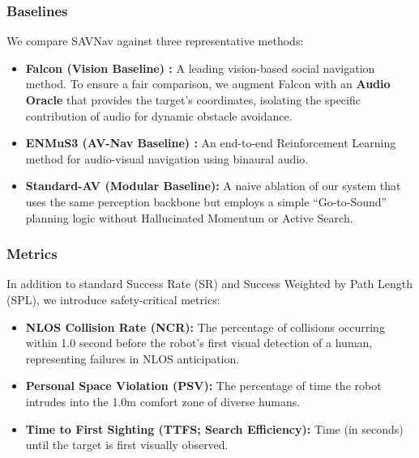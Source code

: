 \subsubsection{Baselines}
We compare SAVNav against three representative methods:
\begin{itemize}
    \item \textbf{Falcon (Vision Baseline) \cite{CognitionPrecognitionFutureaware2025}:} A leading vision-based social navigation method. To ensure a fair comparison, we augment Falcon with an \textbf{Audio Oracle} that provides the target's coordinates, isolating the specific contribution of audio for dynamic obstacle avoidance.
    \item \textbf{ENMuS3 (AV-Nav Baseline) \cite{AudiovisualNavigationNoisy2025}:} An end-to-end Reinforcement Learning method for audio-visual navigation using binaural audio.  
    \item \textbf{Standard-AV (Modular Baseline):} A naive ablation of our system that uses the same perception backbone but employs a simple ``Go-to-Sound'' planning logic without Hallucinated Momentum or Active Search.
\end{itemize}

\subsubsection{Metrics}
In addition to standard Success Rate (SR) and Success Weighted by Path Length (SPL), we introduce safety-critical metrics:
\begin{itemize}
    \item \textbf{NLOS Collision Rate (NCR):} The percentage of collisions occurring within 1.0 second before the robot's first visual detection of a human, representing failures in NLOS anticipation.
    \item \textbf{Personal Space Violation (PSV):} The percentage of time the robot intrudes into the 1.0m comfort zone of diverse humans.
    \item \textbf{Time to First Sighting (TTFS; Search Efficiency):} Time (in seconds) until the target is first visually observed.
\end{itemize}

